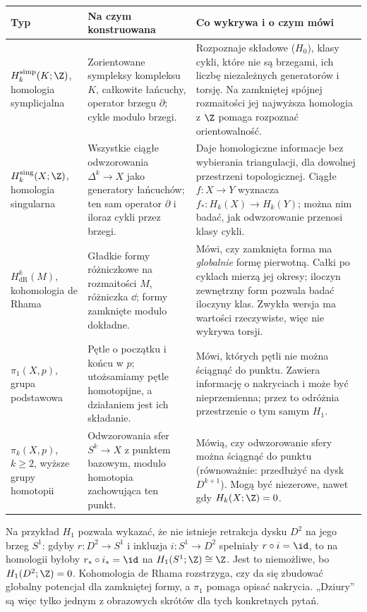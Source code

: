 \begin{center}
\small
\renewcommand{\arraystretch}{1.18}
\begin{tabular}{>{\raggedright\arraybackslash}p{3.05cm}
                >{\raggedright\arraybackslash}p{4.4cm}
                >{\raggedright\arraybackslash}p{6.75cm}}
\hline
\textbf{Typ}&\textbf{Na czym konstruowana}&
\textbf{Co wykrywa i o czym mówi}\\
\hline
$H_k^{\mathrm{simp}}(K;\Z)$,
homologia symplicjalna&
Zorientowane sympleksy kompleksu $K$,
całkowite łańcuchy, operator brzegu
$\partial$; cykle modulo brzegi.&
Rozpoznaje składowe ($H_0$), klasy cykli,
które nie są brzegami, ich liczbę niezależnych
generatorów i torsję. Na zamkniętej spójnej
rozmaitości jej najwyższa homologia z $\Z$
pomaga rozpoznać orientowalność.\\
\hline
$H_k^{\mathrm{sing}}(X;\Z)$,
homologia singularna&
Wszystkie ciągłe odwzorowania
$\Delta^k\to X$ jako generatory łańcuchów;
ten sam operator $\partial$ i iloraz
cykli przez brzegi.&
Daje homologiczne informacje bez wybierania
triangulacji, dla dowolnej przestrzeni
topologicznej. Ciągłe $f:X\to Y$ wyznacza
$f_*:H_k(X)\to H_k(Y)$; można nim badać,
jak odwzorowanie przenosi klasy cykli.\\
\hline
$H^k_{\mathrm{dR}}(M)$,
kohomologia de Rhama&
Gładkie formy różniczkowe na rozmaitości $M$,
różniczka $\dd$; formy zamknięte modulo dokładne.&
Mówi, czy zamknięta forma ma \emph{globalnie}
formę pierwotną. Całki po cyklach mierzą jej
okresy; iloczyn zewnętrzny form pozwala badać
iloczyny klas. Zwykła wersja ma wartości
rzeczywiste, więc nie wykrywa torsji.\\
\hline
$\pi_1(X,p)$,
grupa podstawowa&
Pętle o początku i końcu w $p$;
utożsamiamy pętle homotopijne, a działaniem
jest ich składanie.&
Mówi, których pętli nie można ściągnąć do
punktu. Zawiera informację o nakryciach
i może być nieprzemienna; przez to odróżnia
przestrzenie o tym samym $H_1$.\\
\hline
$\pi_k(X,p)$, $k\geq2$,
wyższe grupy homotopii&
Odwzorowania sfer $S^k\to X$ z punktem
bazowym, modulo homotopia zachowująca
ten punkt.&
Mówią, czy odwzorowanie sfery można
ściągnąć do punktu (równoważnie: przedłużyć
na dysk $D^{k+1}$). Mogą być niezerowe,
nawet gdy $H_k(X;\Z)=0$.\\
\hline
\end{tabular}
\end{center}

Na przykład $H_1$ pozwala wykazać, że
nie istnieje retrakcja dysku $D^2$ na jego
brzeg $S^1$: gdyby $r:D^2\to S^1$
i inkluzja $i:S^1\to D^2$ spełniały
$r\circ i=\id$, to na homologii byłoby
$r_*\circ i_*=\id$ na $H_1(S^1;\Z)\cong\Z$.
Jest to niemożliwe, bo $H_1(D^2;\Z)=0$.
Kohomologia de Rhama rozstrzyga, czy da się
zbudować globalny potencjał dla zamkniętej
formy, a $\pi_1$ pomaga opisać nakrycia.
„Dziury” są więc tylko jednym z obrazowych
skrótów dla tych konkretnych pytań.

